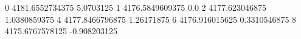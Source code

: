 0 4181.6552734375 5.0703125
1 4176.5849609375 0.0
2 4177.623046875 1.0380859375
4 4177.8466796875 1.26171875
6 4176.916015625 0.3310546875
8 4175.6767578125 -0.908203125
